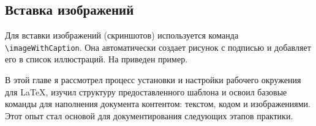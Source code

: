 \subsection{Вставка изображений}\label{subsec:-}
Для вставки изображений (скриншотов) используется команда \texttt{\textbackslash imageWithCaption}.
Она автоматически создает рисунок с подписью и добавляет его в список иллюстраций.
На  приведен пример.

\label{fig:git_branching_example}


В этой главе я рассмотрел процесс установки и настройки рабочего окружения для \LaTeX{}, изучил структуру предоставленного шаблона и освоил базовые команды для наполнения документа контентом: текстом, кодом и изображениями.
Этот опыт стал основой для документирования следующих этапов практики.
